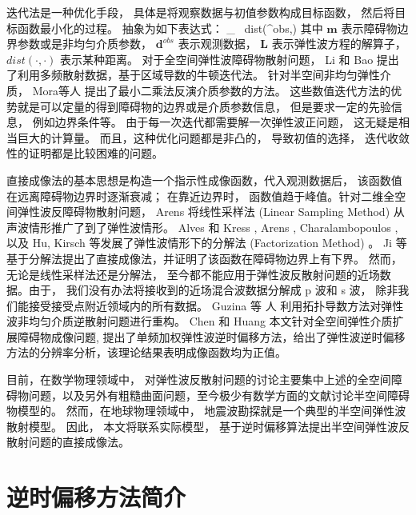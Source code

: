 迭代法是一种优化手段， 具体是将观察数据与初值参数构成目标函数， 然后将目标函数最小化的过程。 抽象为如下表达式：
\ben
\min_{} \ dist(^{obs},)
\een
其中 $\mathbf m$ 表示障碍物边界参数或是非均匀介质参数， $\mathbf{d}^{obs}$ 表示观测数据， $\mathbf{{L}}$ 表示弹性波方程的解算子， $dist(\cdot,\cdot)$ 表示某种距离。
对于全空间弹性波障碍物散射问题， Li \cite{li2016inverse} 和 Bao \cite{bao2018direct} 提出了利用多频散射数据，基于区域导数的牛顿迭代法。 针对半空间非均匀弹性介质， Mora等人 \cite{mora1987nonlinear,feng2017elastic,elita2018elastic} 提出了最小二乘法反演介质参数的方法。 这些数值迭代方法的优势就是可以定量的得到障碍物的边界或是介质参数信息， 但是要求一定的先验信息， 例如边界条件等。 由于每一次迭代都需要解一次弹性波正问题， 这无疑是相当巨大的计算量。 而且，这种优化问题都是非凸的， 导致初值的选择， 迭代收敛性的证明都是比较困难的问题。 

直接成像法的基本思想是构造一个指示性成像函数，代入观测数据后， 该函数值在远离障碍物边界时逐渐衰减； 在靠近边界时， 函数值趋于峰值。针对二维全空间弹性波反障碍物散射问题， Arens \cite{arens2001linear} 将线性采样法 (Linear Sampling Method) 从声波情形推广了到了弹性波情形。  Alves 和 Kress \cite{alves2002far}, Arens \cite{arens2001linear}, Charalambopoulos \cite{charalambopoulos2006factorization}, 以及  Hu, Kirsch \cite{hu2012some} 等发展了弹性波情形下的分解法 (Factorization Method) 。 Ji 等 \cite{ji2018direct} 基于分解法提出了直接成像法，并证明了该函数在障碍物边界上有下界。 然而， 无论是线性采样法还是分解法， 至今都不能应用于弹性波反散射问题的近场数据。由于， 我们没有办法将接收到的近场混合波数据分解成 p 波和 s 波， 除非我们能接受接受点附近领域内的所有数据。 Guzina 等
人 \cite{gintides2012identification} 利用拓扑导数方法对弹性波非均匀介质逆散射问题进行重构。 Chen 和 Huang \cite{ela_reverse} 本文针对全空间弹性介质扩展障碍物成像问题, 提出了单频加权弹性波逆时偏移方法，给出了弹性波逆时偏移方法的分辨率分析，该理论结果表明成像函数均为正值。

目前，在数学物理领域中， 对弹性波反散射问题的讨论主要集中上述的全空间障碍物问题，以及另外有粗糙曲面问题\cite{hu2016factorization,li2016near,liu2019near,hu2018direct}，至今极少有数学方面的文献讨论半空间障碍物模型的。 然而，在地球物理领域中， 地震波勘探就是一个典型的半空间弹性波散射模型。 因此， 本文将联系实际模型， 基于逆时偏移算法提出半空间弹性波反散射问题的直接成像法。



\section{逆时偏移方法简介}

